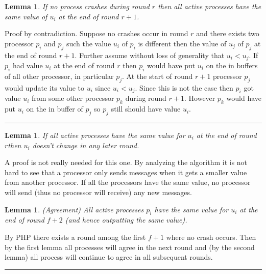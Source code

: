 \documentclass[twoside]{article}
\newtheorem{lemma}[theorem]{Lemma}
\newenvironment{proof}{{\bf Proof:}}{\hfill\rule{2mm}{2mm}}
\begin{document}
\begin{lemma}
If no process crashes during round $r$ then all active processes have the same value of $u_i$ at the end of round $r+1$.
\end{lemma}
\begin{proof}
Proof by contradiction. Suppose no crashes occur in round $r$ and there exists two processor $p_i$ and $p_j$ such the value $u_i$ of $p_i$ is different then the value of $u_j$ of $p_j$ at the end of round $r+1$. Further assume without loss of generality that $u_i < u_j$. If $p_i$ had value $u_i$ at the end of round $r$ then $p_i$ would have put $u_i$ on the in buffers of all other processor, in particular $p_j$. At the start of round $r+1$ processor $p_j$ would update its value to $u_i$ since $u_i < u_j$. Since this is not the case then $p_i$ got value $u_i$ from some other processor $p_k$ during round $r+1$. However $p_k$ would have put $u_i$ on the in buffer of $p_j$ so $p_j$ still should have value $u_i$.   
\end{proof}

\begin{lemma}
If all active processes have the same value for $u_i$ at the end of round $r$then $u_i$ doesn't change in any later round. 
\end{lemma}
A proof is not really needed for this one. By analyzing the algorithm it is not hard to see that a processor only sends messages when it gets a smaller value from another processor. If all the processors have the same value, no processor will send (thus no processor will receive) any new messages.

\begin{lemma}
(Agreement) All active processes $p_i$ have the same value for $u_i$ at the end of round $f+2$ (and hence outputting the same value).
\end{lemma}
\begin{proof}
By PHP there exists a round among the first $f+1$ where no crash occurs. Then by the first lemma all processes will agree in the next round and (by the second lemma) all process will continue to agree in all subsequent rounds. 
\end{proof}
\end{document}

